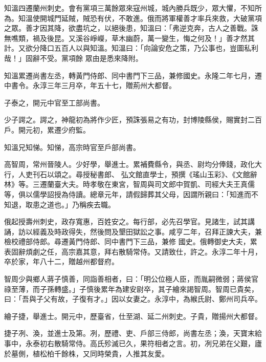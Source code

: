\begin{pinyinscope}
 知溫四遷蘭州刺史。會有黨項三萬餘眾來寇州城，城內勝兵既少，眾大懼，不知所為。知溫使開城門延賊，賊恐有伏，不敢進。俄而將軍權善才率兵來救，大破黨項之眾。善才因其降，欲盡坑之，以絕後患，知溫曰：「弗逆克奔，古人之善戰。誅無噍類，禍及後昆。又溪谷崢嶸，草木幽蔚，萬一變生，悔之何及！」善才然其計。又欲分降口五百人以與知溫。知溫曰：「向論安危之策，乃公事也，豈圖私利哉！」固辭不受。黨項餘
 眾由是悉來降附。



 知溫累遷尚書左丞，轉黃門侍郎、同中書門下三品，兼修國史。永隆二年七月，遷中書令。永淳三年三月卒，年五十七，贈荊州大都督。



 子泰之，開元中官至工部尚書。



 少子諤之。諤之，神龍初為將作少匠，預誅張易之有功，封博陵縣侯，賜實封二百戶。開元初，累遷少府監。



 知溫兄知悌。知悌，高宗時官至戶部尚書。



 高智周，常州晉陵人。少好學，舉進士。累補費縣令，與丞、尉均分俸錢，政化大行，人吏刊石以頌之。尋授秘書郎、
 弘文館直學士，預撰《瑤山玉彩》、《文館辭林》等。三遷蘭臺大夫。時孝敬在東宮，智周與司文郎中賀凱、司經大夫王真儒等，俱以儒學詔授為侍讀。總章元年，請假歸葬其父母，因謂所親曰：「知進而不知退，取患之道也。」乃稱疾去職。



 俄起授壽州刺史，政存寬惠，百姓安之。每行部，必先召學官。見諸生，試其講誦，訪以經義及時政得失，然後問及墾田獄訟之事。咸亨二年，召拜正諫大夫，兼檢校禮部侍郎。尋遷黃門侍郎、同中書門下三品，兼修
 國史。俄轉御史大夫，累表固辭煩劇之任，高宗嘉其意，拜右散騎常侍。又請致仕，許之。永淳二年十月，卒於家，年八十二，贈越州都督府。



 智周少與鄉人蔣子慎善，同詣善相者，曰：「明公位極人臣，而胤嗣微弱；蔣侯官祿至薄，而子孫轉盛。」子慎後累年為建安尉卒，其子繪來謁智周。智周已貴矣，曰：「吾與子父有故，子復有才。」因以女妻之。永淳中，為緱氏尉、鄭州司兵卒。



 繪子捷，舉進士。開元中，歷臺省，仕至湖、延二州刺史。子貴，贈揚州大都督。



 捷子冽、渙，並進士及第。冽，歷禮、吏、戶部三侍郎，尚書左丞；渙，天寶末給事中，永泰初右散騎常侍。高氏殄滅已久，果符相者之言。初，冽兄弟在父艱，廬於墓側，植松柏千餘株，又同時榮貴，人推其友愛。




\end{pinyinscope}
